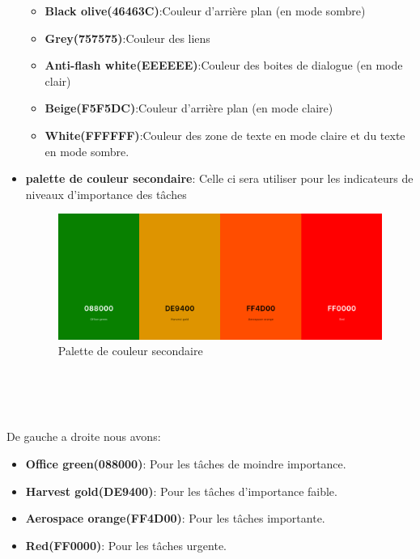 \documentclass[a4paper,12pt]{report}
\begin{document}
\begin{itemize}
\begin{itemize}
    \item\textbf{Black olive(46463C)}:Couleur d'arrière plan (en mode sombre)
    \item\textbf{Grey(757575)}:Couleur des liens
    \item\textbf{Anti-flash white(EEEEEE)}:Couleur des boites de dialogue (en mode clair)
    \item\textbf{Beige(F5F5DC)}:Couleur d'arrière plan (en mode claire)
    \item\textbf{White(FFFFFF)}:Couleur des zone de texte en mode claire et du texte en mode sombre.
  \end{itemize}
  
  \item\textbf{palette de couleur secondaire}: Celle ci sera utiliser pour les indicateurs de niveaux d'importance des tâches
  \begin{figure}[h!]
    \includegraphics[width=1\textwidth]{./images/getdo-color-palette-indicator.png}
    \caption{Palette de couleur secondaire}
    \label{fig:jira_project_task}
  \end{figure}\\ \\ \\
  \end{itemize}
  De gauche a droite nous avons:
  \begin{itemize}
    \item\textbf{Office green(088000)}: Pour les tâches de moindre importance.
    \item\textbf{Harvest gold(DE9400)}: Pour les tâches d'importance faible.
    \item\textbf{Aerospace orange(FF4D00)}: Pour les tâches importante.
    \item\textbf{Red(FF0000)}: Pour les tâches urgente.
  \end{itemize}
\end{document}
